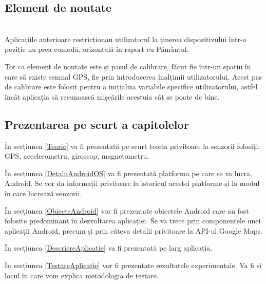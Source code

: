 \documentclass[12pt,a4paper]{article}
\begin{document}
\subsection{Element de noutate}
\\

Aplicațiile anterioare restricționau utilizatorul la ținerea dispozitivului într-o poziție nu prea comodă, orizontală în raport cu Pământul.

Tot ca element de noutate este și pasul de calibrare, făcut fie într-un spațiu în care să existe semnal GPS, fie prin introducerea înalțimii utilizatorului. Acest pas de calibrare este folosit pentru a inițializa variabile specifice utilizatorului, astfel încât aplicația să recunoască mișcările acestuia cât se poate de bine.


\subsection{Prezentarea pe scurt a capitolelor}

În secțiunea \ref{Teorie} va fi prezentată pe scurt teoria privitoare la senzorii folosiți: GPS, accelerometru, giroscop, magnetometru.

În secțiunea \ref{DetaliiAndroidOS} va fi prezentată platforma pe care se va lucra, Android. Se vor da informații privitoare la istoricul acestei platforme și la modul în care lucrează senzorii.

În secțiunea \ref{ObiecteAndroid} vor fi prezentate obiectele Android care au fost folosite predominant în dezvoltarea aplicației. Se va trece prin componentele unei aplicații Android, precum și prin câteva detalii privitoare la API-ul Google Maps.

În secțiunea \ref{DescriereAplicatie} va fi prezentată pe larg aplicația.

În secțiunea \ref{TestareAplicatie} vor fi prezentate rezultatele experimentale. Va fi și locul în care vom explica metodologia de testare.
\end{document}
